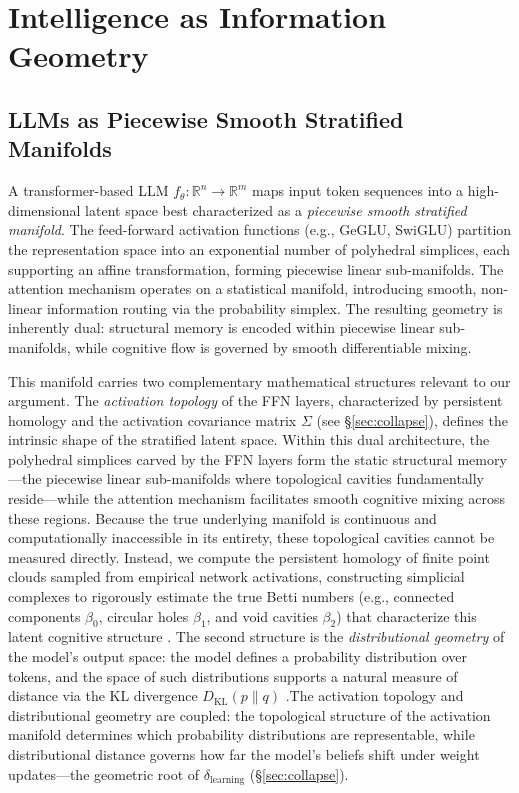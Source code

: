 \documentclass{article}
\begin{document}
\section{Intelligence as Information Geometry}
\label{sec:geometry}

\subsection{LLMs as Piecewise Smooth Stratified Manifolds}

A transformer-based LLM $f_\theta: \mathbb{R}^n \to \mathbb{R}^m$ \citep{Vaswani2017attention} maps input token sequences into a high-dimensional latent space best characterized as a \emph{piecewise smooth stratified manifold}. The feed-forward activation functions (e.g., GeGLU, SwiGLU) partition the representation space into an exponential number of polyhedral simplices, each supporting an affine transformation, forming piecewise linear sub-manifolds. The attention mechanism operates on a statistical manifold, introducing smooth, non-linear information routing via the probability simplex. The resulting geometry is inherently dual: structural memory is encoded within piecewise linear sub-manifolds, while cognitive flow is governed by smooth differentiable mixing.

This manifold carries two complementary mathematical structures relevant to our argument. The \emph{activation topology} of the FFN layers, characterized by persistent homology and the activation covariance matrix $\Sigma$ (see \S\ref{sec:collapse}), defines the intrinsic shape of the stratified latent space. Within this dual architecture, the polyhedral simplices carved by the FFN layers form the static structural memory---the piecewise linear sub-manifolds where topological cavities fundamentally reside---while the attention mechanism facilitates smooth cognitive mixing across these regions. Because the true underlying manifold is continuous and computationally inaccessible in its entirety, these topological cavities cannot be measured directly. Instead, we compute the persistent homology of finite point clouds sampled from empirical network activations, constructing simplicial complexes to rigorously estimate the true Betti numbers (e.g., connected components $\beta_0$, circular holes $\beta_1$, and void cavities $\beta_2$) that characterize this latent cognitive structure \citep{Edelsbrunner2008persistent,Carlsson2009topology}. The second structure is the \emph{distributional geometry} of the model's output space: the model defines a probability distribution over tokens, and the space of such distributions supports a natural measure of distance via the KL divergence $D_{\text{KL}}(p \| q)$ \citep{Amari2016information}.The activation topology and distributional geometry are coupled: the topological structure of the activation manifold determines which probability distributions are representable, while distributional distance governs how far the model's beliefs shift under weight updates---the geometric root of $\delta_{\text{learning}}$ (\S\ref{sec:collapse}).
\end{document}
